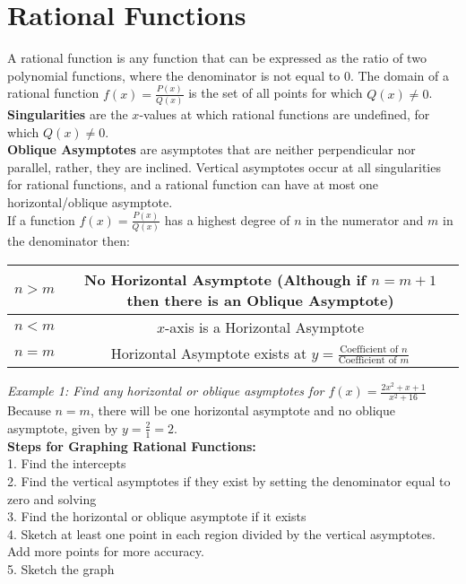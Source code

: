 \section{Rational Functions}

    A rational function is any function that can be expressed as the ratio of two polynomial
    functions, where the denominator is not equal to 0. The domain of a rational function
    $f(x)=\frac{P(x)}{Q(x)}$ is the set of all points for which $Q(x)\not=0$.
    \textbf{Singularities} are the $x$-values at which rational functions are undefined, for
    which $Q(x)\not=0$. \\

    \noindent \textbf{Oblique Asymptotes} are asymptotes that are neither perpendicular nor
    parallel, rather, they are inclined. Vertical asymptotes occur at all singularities for
    rational functions, and a rational function can have at most one horizontal/oblique asymptote. \\

    \noindent If a function $f(x)=\frac{P(x)}{Q(x)}$ has a highest degree of $n$ in the numerator
    and $m$ in the denominator then: \\

    \begin{center}
        \begin{tabular}{|c|c|}
            \hline
            $n>m$ & No Horizontal Asymptote (Although if $n=m+1$ then there is an Oblique Asymptote)            \\
            \hline
            $n<m$ & $x$-axis is a Horizontal Asymptote                                                          \\
            \hline
            $n=m$ & Horizontal Asymptote exists at $y=\frac{\text{Coefficient of }        n}{\text{Coefficient of } m}$ \\
            \hline
        \end{tabular}
    \end{center}

    \noindent \color{blue} \textit{Example 1: Find any horizontal or oblique asymptotes for
    $f(x)=\frac{2x^2+x+1}{x^2+16}$} \color{black} \\
    Because $n=m$, there will be one horizontal asymptote and no oblique asymptote, given by
    $y=\frac{2}{1}=2$. \\

    \noindent \color{purple} \textbf{Steps for Graphing Rational Functions:} \color{black} \\
    1. Find the intercepts \\
    2. Find the vertical asymptotes if they exist by setting the denominator equal to zero and solving \\
    3. Find the horizontal or oblique asymptote if it exists \\
    4. Sketch at least one point in each region divided by the vertical asymptotes.
    Add more points for more accuracy. \\
    5. Sketch the graph \\

